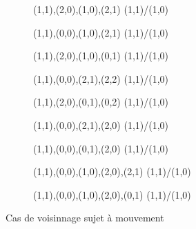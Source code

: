 \begin{figure}
\begin{subfigure}[b]{0.15\textwidth}
{       {{(1,1),(2,0),(1,0),(2,1)}}       {{{(1,1)/(1,0)}}}
    }
    \caption{}
  \end{subfigure}
  \begin{subfigure}[b]{0.15\textwidth}
    \resizebox{\linewidth}{!} {
       {{(1,1),(0,0),(1,0),(2,1)}}       {{{(1,1)/(1,0)}}}
    }
    \caption{}
  \end{subfigure}
  \begin{subfigure}[b]{0.15\textwidth}
    \resizebox{\linewidth}{!} {
       {{(1,1),(2,0),(1,0),(0,1)}}       {{{(1,1)/(1,0)}}}
    }
    \caption{}
  \end{subfigure}
  \begin{subfigure}[b]{0.15\textwidth}
    \resizebox{\linewidth}{!} {
       {{(1,1),(0,0),(2,1),(2,2)}}       {{{(1,1)/(1,0)}}}
    }
    \caption{}
  \end{subfigure}
  \begin{subfigure}[b]{0.15\textwidth}
    \resizebox{\linewidth}{!} {
       {{(1,1),(2,0),(0,1),(0,2)}}       {{{(1,1)/(1,0)}}}
    }
    \caption{}
  \end{subfigure}
  \begin{subfigure}[b]{0.15\textwidth}
    \resizebox{\linewidth}{!} {
       {{(1,1),(0,0),(2,1),(2,0)}}       {{{(1,1)/(1,0)}}}
    }
    \caption{}
  \end{subfigure}
  \begin{subfigure}[b]{0.15\textwidth}
    \resizebox{\linewidth}{!} {
       {{(1,1),(0,0),(0,1),(2,0)}}       {{{(1,1)/(1,0)}}}
    }
    \caption{}
  \end{subfigure}
  \begin{subfigure}[b]{0.15\textwidth}
    \resizebox{\linewidth}{!} {
       {{(1,1),(0,0),(1,0),(2,0),(2,1)}} {{{(1,1)/(1,0)}}}
    }
    \caption{}
  \end{subfigure}
  \begin{subfigure}[b]{0.15\textwidth}
    \resizebox{\linewidth}{!} {
       {{(1,1),(0,0),(1,0),(2,0),(0,1)}} {{{(1,1)/(1,0)}}}
    }
    \caption{}
  \end{subfigure}
\caption{Cas de voisinnage sujet à mouvement}
\end{figure}

